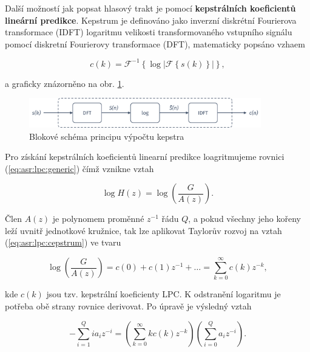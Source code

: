 Další možností jak popsat hlasový trakt je pomocí \textbf{kepstrálních koeficientů lineární predikce}. Kepstrum je definováno jako inverzní diskrétní Fourierova transformace (IDFT) logaritmu velikosti transformovaného vstupního signálu pomocí diskretní Fourierovy transformace (DFT), matematicky popsáno vzhaem

\begin{equation}
  c(k) = \mathcal{F}^{-1}\left\{\log\left| \mathcal{F}\left\{s(k)\right\} \right|\right\},
  \label{eq:asr:lpc:cepstrum:generic}
\end{equation}

\noindent a graficky znázorněno na obr. \ref{fig:asr:model:speech:cepstrum}.

\begin{figure}[hbpt]
  \centering
  \includegraphics[width=0.9\textwidth]{./ch4-asr/img/cepstrum.pdf}
  \caption{Blokové schéma principu výpočtu kepstra}
  \label{fig:asr:model:speech:cepstrum}
\end{figure}

Pro získání kepstrálních koeficientů linearní predikce loagritmujeme rovnici (\ref{eq:asr:lpc:generic}) čímž vznikne vztah

\begin{equation}
  \log H(z) = \log \left( \frac{G}{A(z)} \right).
  \label{eq:asr:lpc:cepstrum}
\end{equation}

\noindent Člen $A(z)$ je polynomem proměnné $z^{-1}$ řádu $Q$, a pokud všechny jeho kořeny leží uvnitř jednotkové kružnice, tak lze aplikovat Taylorův rozvoj na vztah (\ref{eq:asr:lpc:cepstrum}) ve tvaru

\begin{equation}
  \log \left( \frac{G}{A(z)} \right) = c(0) + c(1)z^{-1} + \dots = \sum_{k=0}^{\infty} c(k)z^{-k},
  \label{eq:asr:lpc:cepstrum:taylor}
\end{equation}

\noindent kde $c(k)$ jsou tzv. kepstrální koeficienty LPC. K odstranění logaritmu je potřeba obě strany rovnice derivovat. Po úpravě je výsledný vztah

\begin{equation}
  - \sum_{i=1}^{Q} ia_iz^{-i} = \left( \sum_{k=0}^{\infty} kc(k)z^{-k} \right)\left( \sum_{i=0}^{Q} a_iz^{-i}\right).
  \label{eq:asr:lpc:cepstrum:deriv}
\end{equation}


